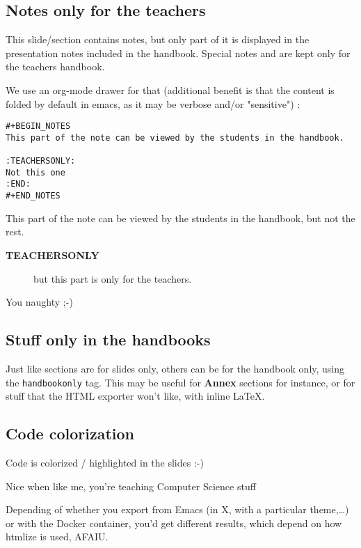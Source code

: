 \documentclass[a4paper]{article}
\newenvironment{NOTES}{\begin{lrbox}{\mybox}\begin{minipage}{0.9\textwidth}\begin{shaded}}{\end{shaded}\end{minipage}\end{lrbox}\fbox{\usebox{\mybox}}}
\begin{document}
\subsection{Notes only for the teachers}
\label{sec:org0999576}

This slide/section contains notes, but only part of it is displayed in
the presentation notes included in the handbook. Special notes and are
kept only for the teachers handbook.

We use an org-mode drawer for that (additional benefit is that the content is folded by default in emacs, as it may be verbose and/or "sensitive") :
\begin{verbatim}
#+BEGIN_NOTES
This part of the note can be viewed by the students in the handbook.

:TEACHERSONLY:
Not this one
:END:
#+END_NOTES
\end{verbatim}

\begin{NOTES}


This part of the note can be viewed by the students in the handbook,
but not the rest.

\begin{description}
\item[{\textbf{TEACHERSONLY}}] but this part is only for the teachers.
\end{description}

You naughty ;-)
\end{NOTES}

\subsection{Stuff only in the handbooks}
\label{sec:org04bbc23}

Just like sections are for slides only, others can be for the handbook
only, using the \texttt{handbookonly} tag. This may be useful for \textbf{Annex}
sections for instance, or for stuff that the HTML exporter won't like, with inline \LaTeX{}.

\subsection{Code colorization}
\label{sec:orgb5d52c6}
Code is colorized / highlighted in the slides :-)

\begin{NOTES}
Nice when like me, you're teaching Computer Science stuff

Depending of whether you export from Emacs (in X, with a particular
theme,\ldots{}) or with the Docker container, you'd get different results,
which depend on how htmlize is used, AFAIU.
\end{NOTES}
\end{document}

